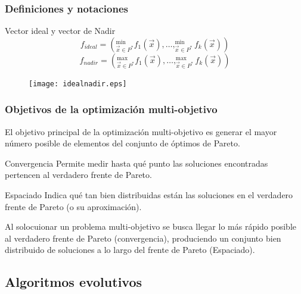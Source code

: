 \documentclass[10pt,compress]{beamer}
\begin{document}
\begin{frame}
	\frametitle{Definiciones y notaciones}		
	\begin{block}{Vector ideal y vector de Nadir}
	 \[  f_{ideal}= \left(^{\min}_{\vec{x}\in P^*}f_1\left(\vec{x}\right), \ldots, ^{\min}_{\vec{x}\in P^*}f_k\left(\vec{x}\right) \right)\]
\[  f_{nadir}= \left(^{\max}_{\vec{x}\in P^*}f_1\left(\vec{x}\right), \ldots, ^{\max}_{\vec{x}\in P^*}f_k\left(\vec{x}\right) \right)\]
	\end{block}
	
	\begin{figure}[h!]
			\centering
				\texttt{[image: idealnadir.eps]}	
							
     \end{figure}	
\end{frame}

\begin{frame}
	\frametitle{Objetivos de la optimizaci\'on multi-objetivo}
	El objetivo principal de la optimizaci\'on multi-objetivo es generar el mayor n\'umero posible de elementos del conjunto de \'optimos de Pareto.
	
	\begin{block}{Convergencia}
		Permite medir hasta qu\'e punto las soluciones encontradas pertencen al verdadero frente de Pareto.
	\end{block}
	\begin{block}{Espaciado}
		Indica qu\'e tan bien distribuidas est\'an las soluciones en el verdadero frente de Pareto (o su aproximaci\'on).
	\end{block}
	Al solocuionar un problema multi-objetivo se busca llegar lo m\'as r\'apido posible al verdadero frente de Pareto (convergencia), 
	produciendo un conjunto bien distribuido de soluciones a lo largo del frente de Pareto (Espaciado).
\end{frame}

\subsection{Algoritmos evolutivos}
\end{document}
